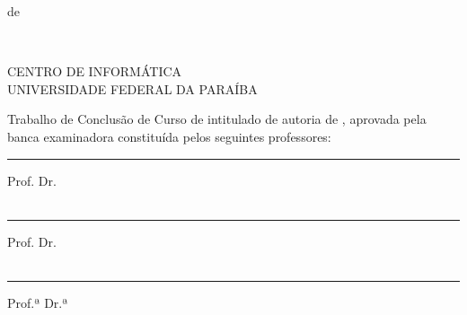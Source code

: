\documentclass{tcc}
\begin{document}
\vfill
\begin{center}
\MONTH de \the\year
\end{center}

\newpage

$ $
\vfill

\begin{flushright}
\end{flushright}

\newpage



\begin{center}
CENTRO DE INFORMÁTICA \\
UNIVERSIDADE FEDERAL DA PARAÍBA
\end{center}

\vspace{0.05in}

\noindent Trabalho de Conclusão de Curso de \nomedocurso intitulado \textit{\bf \em \thetitle} de autoria de \theauthor, aprovada pela banca examinadora constituída pelos seguintes professores: \\

\vspace{0.7in}

\hrule
\vspace{5pt}
\noindent Prof. Dr. \profa\\
\insta\\

\vspace{0.25in}

\hrule
\vspace{5pt}
\noindent Prof. Dr. \profb\\
\instb\\

\vspace{0.25in}

\hrule
\vspace{5pt}
\noindent Prof.ª Dr.ª \profc\\
\instc\\

\vspace{0.2in}
\end{document}
